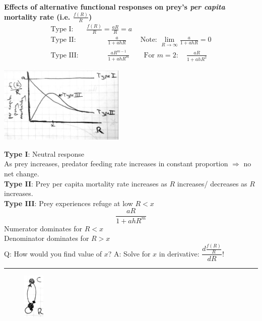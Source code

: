 \documentclass{article}
\newcommand{\note}[1]{\colorbox{gray!30}{#1}}
\newcommand{\ind}{\-\hspace{1cm}}
\begin{document}
\textbf{Effects of alternative functional responses on prey's \emph{per capita} mortality rate (i.e. $\frac{f(R)}{R}$)}
\begin{align*}
	\text{Type I: } &\frac{f(R)}{R}=\frac{aR}{R}=a \\
	\text{Type II: } & \quad \qquad \frac{a}{1+ahR} \quad \quad \text{Note: }\lim_{R \to \infty}\frac{a}{1+ahR}=0\\
	\text{Type III: } &  \qquad \quad \frac{aR^{m-1}}{1+ahR^m} \quad \quad \text{For }m=2: \quad \frac{aR}{1+ahR^2}
\end{align*}
\begin{center}
\includegraphics[width=6cm]{figs/PreyMort.pdf}
\end{center}

\textbf{Type I}: Neutral response\\
\ind \ind As prey increases, predator feeding rate increases in constant proportion $\Rightarrow$ no net change.\\
\textbf{Type II}: Prey per capita mortality rate increases as $R$ increases/ decreases as $R$ increases.\\
\textbf{Type III}: Prey experiences refuge at low $R < x$
\begin{equation*}
\frac{a  R}{1+ahR^m}
\end{equation*}
\ind \ind \ind Numerator dominates for $R<x$\\
\ind \ind \ind Denominator dominates for $R>x$\\

\note{Q:} How would you find value of $x$?
\note{A:} Solve for $x$ in derivative: $\dfrac{d \frac{f(R)}{R}}{dR}$!

\rule[0.5ex]{\linewidth}{1pt}

\begin{figure}
\includegraphics[width=1cm]{figs/CR_digraph2.pdf}
\end{figure}
\end{document}
